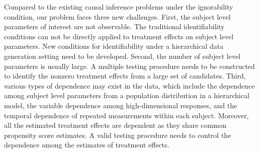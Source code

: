 \documentclass[12pt]{article}
\theoremstyle{definition}
\newcommand{\bX}{{\mathbf X}}
\begin{document}
Compared to the existing causal inference problems under the ignorability condition, our problem faces three new challenges.
First, the subject level parameters of interest are not observable. The traditional identifiability conditions can not be directly applied to treatment effects on subject level parameters.
New conditions for identifiability under a hierarchical data generation setting need to be developed. Second, the number of subject level parameters is usually large. 
A multiple testing procedure needs to be constructed to identify the nonzero treatment effects from a large set of candidates. 
Third, various types of dependence may exist in the data, which include the dependence among subject level parameters from a population distribution in a hierarchical model, the variable dependence among high-dimensional responses, and the temporal dependence of repeated measurements within each subject. Moreover, all the estimated treatment effects are dependent as they share common propensity score estimates. 
A valid testing procedure needs to control the dependence among the estimates of treatment effects.
\end{document}
